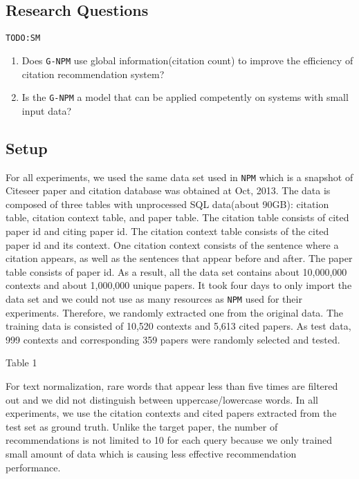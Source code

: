 \documentclass{llncs}
\newcommand{\name}{\texttt{G-NPM}\xspace}
\newcommand{\npm}{\texttt{NPM}\xspace}
\newcommand{\todo}[1]{\texttt{\color{red}TODO:#1}}
\begin{document}
\subsection{Research Questions}
\todo{SM}

\begin{enumerate}
\item Does \name use global information(citation count) to improve the efficiency of citation recommendation system?
\item Is the \name a model that can be applied competently on systems with small input data?
\end{enumerate}
\subsection{Setup}
For all experiments, we used the same data set used in \npm which is a snapshot of Citeseer paper and citation database was obtained at Oct, 2013. The data is composed of three tables with unprocessed SQL data(about 90GB): citation table, citation context table, and paper table. The citation table consists of cited paper id and citing paper id. The citation context table consists of the cited paper id and its context. One citation context consists of the sentence where a citation appears, as well as the sentences that appear before and after. The paper table consists of paper id. As a result, all the data set contains about 10,000,000 contexts and about 1,000,000 unique papers.
It took four days to only import the data set and we could not use as many resources as \npm used for their experiments. Therefore, we randomly extracted one from the original data. The training data is consisted of 10,520 contexts and 5,613 cited papers. As test data, 999 contexts and corresponding 359 papers were randomly selected and tested.


Table 1

For text normalization, rare words that appear less than five times are filtered out and we did not distinguish between uppercase/lowercase words. In all experiments, we use the citation contexts and cited papers extracted from the test set as ground truth. Unlike the target paper, the number of recommendations is not limited to 10 for each query because we only trained small amount of data which is causing less effective recommendation performance.
\end{document}
